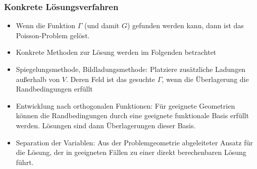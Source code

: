 \begin{frame}
  \frametitle{Konkrete Lösungsverfahren}
  \begin{itemize}[<+->]
\item \alert{Wenn} die Funktion $\Gamma$ (und damit $G$) gefunden werden kann, dann ist das Poisson-Problem gelöst.
\item Konkrete Methoden zur Lösung werden im Folgenden betrachtet
\item \alert{Spiegelungsmethode}, \alert{Bildladungsmethode}: Platziere zusätzliche Ladungen \alert{außerhalb} von $V$. Deren Feld ist das gesuchte $\Gamma$, wenn die Überlagerung die Randbedingungen erfüllt
\item \alert{Entwicklung nach orthogonalen Funktionen:} Für geeignete Geometrien können die Randbedingungen durch eine geeignete funktionale Basis erfüllt werden. Lösungen sind dann Überlagerungen dieser Basis.
  \item \alert{Separation der Variablen}: Aus der Problemgeometrie abgeleiteter Ansatz für die Lösung, der in geeigneten Fällen zu einer direkt berechenbaren Lösung führt.
\end{itemize}
\end{frame}



   
